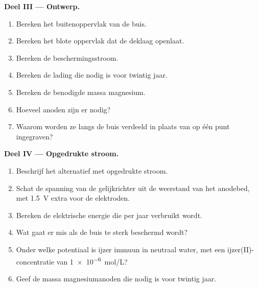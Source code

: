 \begin{problem}
\medskip
\noindent\textbf{Deel III --- Ontwerp.}
\begin{enumerate}[resume]
  \item Bereken het buitenoppervlak van de buis.
  \item Bereken het blote oppervlak dat de deklaag openlaat.
  \item Bereken de beschermingsstroom.
  \item Bereken de lading die nodig is voor twintig jaar.
  \item Bereken de benodigde massa magnesium.
  \item Hoeveel anoden zijn er nodig?
  \item Waarom worden ze langs de buis verdeeld in plaats van op één
        punt ingegraven?
\end{enumerate}

\medskip
\noindent\textbf{Deel IV --- Opgedrukte stroom.}
\begin{enumerate}[resume]
  \item Beschrijf het alternatief met opgedrukte stroom.
  \item Schat de spanning van de gelijkrichter uit de weerstand van het anodebed,
        met \qty{1.5}{V} extra voor de elektroden.
  \item Bereken de elektrische energie die per jaar verbruikt wordt.
  \item Wat gaat er mis als de buis te sterk beschermd wordt?
  \item Onder welke potentiaal is ijzer immuun in neutraal water, met een
        ijzer(II)-concentratie van \qty{1e-6}{mol/L}?
  \item Geef de massa magnesiumanoden die nodig is voor twintig jaar.
\end{enumerate}
\end{problem}
